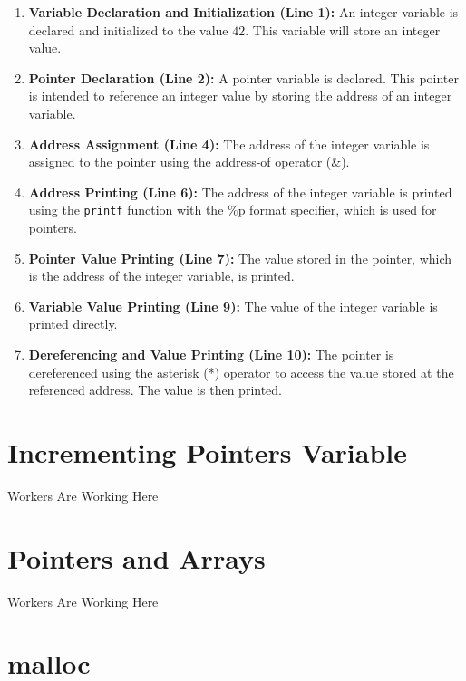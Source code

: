 \begin{enumerate}
    \item \textbf{Variable Declaration and Initialization (Line 1):} An integer variable is declared and initialized to the value \(42\). This variable will store an integer value.

    \item \textbf{Pointer Declaration (Line 2):} A pointer variable is declared. This pointer is intended to reference an integer value by storing the address of an integer variable.

    \item \textbf{Address Assignment (Line 4):} The address of the integer variable is assigned to the pointer using the address-of operator (\&).

    \item \textbf{Address Printing (Line 6):} The address of the integer variable is printed using the \texttt{printf} function with the \%p format specifier, which is used for pointers.

    \item \textbf{Pointer Value Printing (Line 7):} The value stored in the pointer, which is the address of the integer variable, is printed.

    \item \textbf{Variable Value Printing (Line 9):} The value of the integer variable is printed directly.

    \item \textbf{Dereferencing and Value Printing (Line 10):} The pointer is dereferenced using the asterisk (*) operator to access the value stored at the referenced address. The value is then printed.
\end{enumerate}



\section{Incrementing Pointers Variable}
Workers Are Working Here
\section{Pointers and Arrays}
Workers Are Working Here
\section{malloc}
